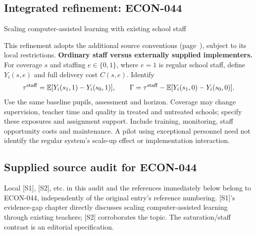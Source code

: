\documentclass[11pt,a4paper]{article}
\begin{document}
\subsection*{Integrated refinement: ECON-044}
{\sffamily\small\color{muted}Scaling computer-assisted learning with existing school staff\par}
This refinement adopts the additional source conventions
(page~\pageref{audited:conventions}), subject to its local restrictions.
\textbf{Ordinary staff versus externally supplied implementers.}
For coverage $s$ and staffing $e\in\{0,1\}$, where $e=1$ is regular school staff,
define $Y_i(s,e)$ and full delivery cost $C(s,e)$. Identify
\[
\tau^{\rm staff}=\mathbb E[Y_i(s_1,1)-Y_i(s_0,1)],\qquad
\Gamma=\tau^{\rm staff}
       -\mathbb E[Y_i(s_1,0)-Y_i(s_0,0)].
\]
Use the same baseline pupils, assessment and horizon. Coverage may change
supervision, teacher time and quality in treated and untreated schools; specify
these exposures and assignment support. Include training, monitoring, staff
opportunity costs and maintenance. A pilot using exceptional personnel need not
identify the regular system's scale-up effect or implementation interaction.
\subsection*{Supplied source audit for ECON-044}
Local [S1], [S2], etc. in this audit and the references immediately below
belong to ECON-044, independently of the original entry's reference numbering.
[S1]'s evidence-gap chapter directly discusses scaling computer-assisted learning through existing teachers; [S2] corroborates the topic. The saturation/staff contrast is an editorial specification.
\end{document}
